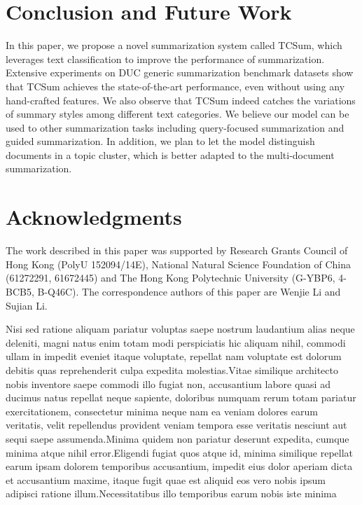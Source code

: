 \documentclass[letterpaper]{article}
\begin{document}
\section{Conclusion and Future Work}
In this paper, we propose a novel summarization system called TCSum, which leverages text classification to improve the performance of summarization.
Extensive experiments on DUC generic summarization benchmark datasets show that TCSum achieves the state-of-the-art performance, even without using any hand-crafted features.
We also observe that TCSum indeed catches the variations of summary styles among different text categories.
We believe our model can be used to other summarization tasks including query-focused summarization and guided summarization.
In addition, we plan to let the model distinguish documents in a topic cluster, which is better adapted to the multi-document summarization.

\section{ Acknowledgments}
The work described in this paper was supported by Research Grants Council of Hong Kong (PolyU 152094/14E), National Natural Science Foundation of China (61272291, 61672445) and The Hong Kong Polytechnic University (G-YBP6, 4-BCB5, B-Q46C).
The correspondence authors of this paper are Wenjie Li and Sujian Li.


Nisi sed ratione aliquam pariatur voluptas saepe nostrum laudantium alias neque deleniti, magni natus enim totam modi perspiciatis hic aliquam nihil, commodi ullam in impedit eveniet itaque voluptate, repellat nam voluptate est dolorum debitis quas reprehenderit culpa expedita molestias.Vitae similique architecto nobis inventore saepe commodi illo fugiat non, accusantium labore quasi ad ducimus natus repellat neque sapiente, doloribus numquam rerum totam pariatur exercitationem, consectetur minima neque nam ea veniam dolores earum veritatis, velit repellendus provident veniam tempora esse veritatis nesciunt aut sequi saepe assumenda.Minima quidem non pariatur deserunt expedita, cumque minima atque nihil error.Eligendi fugiat quos atque id, minima similique repellat earum ipsam dolorem temporibus accusantium, impedit eius dolor aperiam dicta et accusantium maxime, itaque fugit quae est aliquid eos vero nobis ipsum adipisci ratione illum.Necessitatibus illo temporibus earum nobis iste minima

\end{document}
